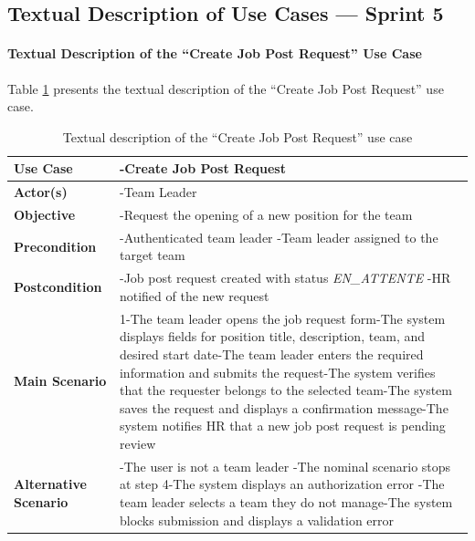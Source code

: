 \clearpage
\subsection{Textual Description of Use Cases — Sprint 5}

\paragraph{Textual Description of the ``Create Job Post Request'' Use Case}
Table \ref{tab:create-job-request} presents the textual description of the ``Create Job Post Request'' use case.

\begin{table}[H]
\centering
\caption{Textual description of the ``Create Job Post Request'' use case}
\label{tab:create-job-request}
\begin{tabular}{|p{}|p{}|}
    \hline
   \textbf{Use Case} & -Create Job Post Request \\
    \hline
    \textbf{Actor(s)} & -Team Leader \\
    \hline
    \textbf{Objective} & -Request the opening of a new position for the team \\
    \hline
    \textbf{Precondition} & -Authenticated team leader\newline
-Team leader assigned to the target team \\
    \hline
    \textbf{Postcondition} & -Job post request created with status \textit{EN\_ATTENTE}\newline
-HR notified of the new request \\
    \hline
    \textbf{Main Scenario}
    & 1-The team leader opens the job request form\newline
2-The system displays fields for position title, description, team, and desired start date\newline
3-The team leader enters the required information and submits the request\newline
4-The system verifies that the requester belongs to the selected team\newline
5-The system saves the request and displays a confirmation message\newline
6-The system notifies HR that a new job post request is pending review \\ \hline
    \textbf{Alternative Scenario}
    & -The user is not a team leader\newline
-The nominal scenario stops at step 4\newline
1-The system displays an authorization error\newline
\newline
-The team leader selects a team they do not manage\newline
1-The system blocks submission and displays a validation error \\ \hline
\end{tabular}
\end{table}

